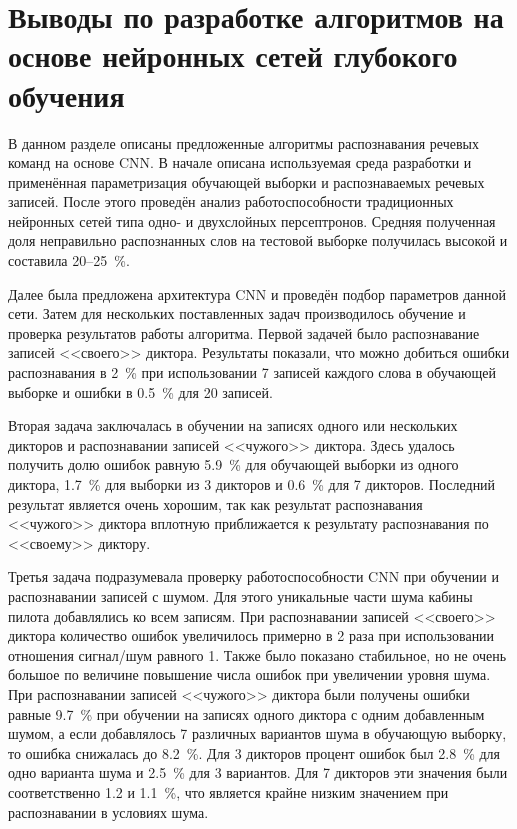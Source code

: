 \section{Выводы по разработке алгоритмов на основе нейронных сетей глубокого обучения} \label{sect4_7}

В данном разделе описаны предложенные алгоритмы распознавания речевых команд на основе CNN.
В начале описана используемая среда разработки и применённая параметризация обучающей выборки и распознаваемых речевых записей.
После этого проведён анализ работоспособности традиционных нейронных сетей типа одно- и двухслойных персептронов.
Средняя полученная доля неправильно распознанных слов на тестовой выборке получилась высокой и составила 20--25~\%.

Далее была предложена архитектура CNN и проведён подбор параметров данной сети.
Затем для нескольких поставленных задач производилось обучение и проверка результатов работы алгоритма.
Первой задачей было распознавание записей <<своего>> диктора.
Результаты показали, что можно добиться ошибки распознавания в 2~\% при использовании 7 записей каждого слова в обучающей выборке и ошибки в 0.5~\% для 20 записей.

Вторая задача заключалась в обучении на записях одного или нескольких дикторов и распознавании записей <<чужого>> диктора.
Здесь удалось получить долю ошибок равную 5.9~\% для обучающей выборки из одного диктора, 1.7~\% для выборки из 3 дикторов и 0.6~\% для 7 дикторов.
Последний результат является очень хорошим, так как результат распознавания <<чужого>> диктора вплотную приближается к результату распознавания по <<своему>> диктору.

Третья задача подразумевала проверку работоспособности CNN при обучении и распознавании записей с шумом.
Для этого уникальные части шума кабины пилота добавлялись ко всем записям.
При распознавании записей <<своего>> диктора количество ошибок увеличилось примерно в 2 раза при использовании отношения сигнал/шум равного 1.
Также было показано стабильное, но не очень большое по величине повышение числа ошибок при увеличении уровня шума.
При распознавании записей <<чужого>> диктора были получены ошибки равные 9.7~\% при обучении на записях одного диктора с одним добавленным шумом, а если добавлялось 7 различных вариантов шума в обучающую выборку, то ошибка снижалась до 8.2~\%.
Для 3 дикторов процент ошибок был 2.8~\% для одно варианта шума и 2.5~\% для 3 вариантов.
Для 7 дикторов эти значения были соответственно 1.2 и 1.1~\%, что является крайне низким значением при распознавании в условиях шума.

